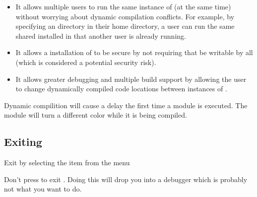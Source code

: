 \begin{itemize}
\item It allows multiple users to run the same instance of \sr{} (at
  the same time) without worrying about dynamic compilation conflicts.
  For example, by specifying an 
  directory in their home directory, a user can run the same shared
  \sr{} installed in  that another user
  is already running.

\item It allows a  installation of \sr{}
  to be secure by not requiring that
   be writable by
  all (which is considered a potential security risk).

\item It allows greater debugging and multiple build support by
  allowing the user to change dynamically compiled code locations
  between instances of \sr{}.

\end{itemize}

Dynamic compilition will cause a delay the first time a module is
executed.  The module will turn a different color while it is being
compiled.

\subsection{Exiting \sr{}}
\label{sec:stopping}

Exit \sr{} by selecting the  item from the  menu

Don't press  to exit \sr{}.  Doing this will drop
you into a debugger which is probably not what you want to do.


